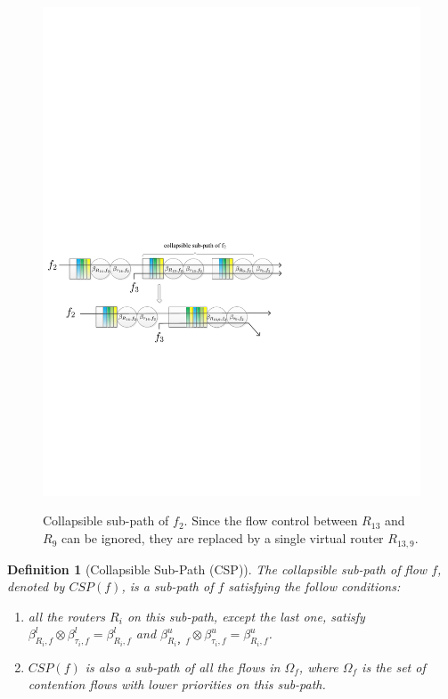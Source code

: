 \documentclass[10pt,journal]{IEEEtran}
\newtheorem{definition}{Definition}
\begin{document}
\begin{figure}
  \centering
  \includegraphics[scale=0.65]{figures/collapse.pdf}\\
  \caption{Collapsible sub-path of $f_2$. Since the flow control between $R_{13}$ and $R_9$ can be ignored, they are replaced by a single virtual router $R_{13,9}$.}\label{collapse}
\end{figure}

\begin{definition}[Collapsible Sub-Path (CSP)]
The collapsible sub-path of flow $f$, denoted by $CSP(f)$, is a sub-path of $f$ satisfying the follow conditions:
\begin{enumerate}
  \item all the routers $R_i$ on this sub-path, except the last one, satisfy $\beta_{R_{i},f}^l\otimes\beta_{\tau_{i},f}^l=\beta_{R_{i},f}^l$ and $\beta_{R_{i}，f}^u\otimes\beta_{\tau_{i},f}^u=\beta_{R_{i},f}^u$.
  \item $CSP(f)$ is also a sub-path of all the flows in $\Omega_{f}$, where $\Omega_{f}$ is the set of contention flows with lower priorities on this sub-path.
\end{enumerate}
\end{definition}
\end{document}
